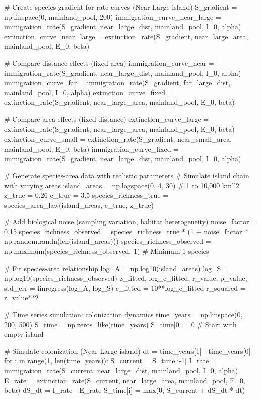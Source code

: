 \documentclass[a4paper, 11pt]{article}
\begin{document}
\begin{pycode}
# Create species gradient for rate curves (Near Large island)
S_gradient = np.linspace(0, mainland_pool, 200)
immigration_curve_near_large = immigration_rate(S_gradient, near_large_dist, mainland_pool, I_0, alpha)
extinction_curve_near_large = extinction_rate(S_gradient, near_large_area, mainland_pool, E_0, beta)

# Compare distance effects (fixed area)
immigration_curve_near = immigration_rate(S_gradient, near_large_dist, mainland_pool, I_0, alpha)
immigration_curve_far = immigration_rate(S_gradient, far_large_dist, mainland_pool, I_0, alpha)
extinction_curve_fixed = extinction_rate(S_gradient, near_large_area, mainland_pool, E_0, beta)

# Compare area effects (fixed distance)
extinction_curve_large = extinction_rate(S_gradient, near_large_area, mainland_pool, E_0, beta)
extinction_curve_small = extinction_rate(S_gradient, near_small_area, mainland_pool, E_0, beta)
immigration_curve_fixed = immigration_rate(S_gradient, near_large_dist, mainland_pool, I_0, alpha)

# Generate species-area data with realistic parameters
# Simulate island chain with varying areas
island_areas = np.logspace(0, 4, 30)  # 1 to 10,000 km^2
z_true = 0.26
c_true = 3.5
species_richness_true = species_area_law(island_areas, c_true, z_true)

# Add biological noise (sampling variation, habitat heterogeneity)
noise_factor = 0.15
species_richness_observed = species_richness_true * (1 + noise_factor * np.random.randn(len(island_areas)))
species_richness_observed = np.maximum(species_richness_observed, 1)  # Minimum 1 species

# Fit species-area relationship
log_A = np.log10(island_areas)
log_S = np.log10(species_richness_observed)
z_fitted, log_c_fitted, r_value, p_value, std_err = linregress(log_A, log_S)
c_fitted = 10**log_c_fitted
r_squared = r_value**2

# Time series simulation: colonization dynamics
time_years = np.linspace(0, 200, 500)
S_time = np.zeros_like(time_years)
S_time[0] = 0  # Start with empty island

# Simulate colonization (Near Large island)
dt = time_years[1] - time_years[0]
for i in range(1, len(time_years)):
    S_current = S_time[i-1]
    I_rate = immigration_rate(S_current, near_large_dist, mainland_pool, I_0, alpha)
    E_rate = extinction_rate(S_current, near_large_area, mainland_pool, E_0, beta)
    dS_dt = I_rate - E_rate
    S_time[i] = max(0, S_current + dS_dt * dt)


\end{pycode}
\end{document}
